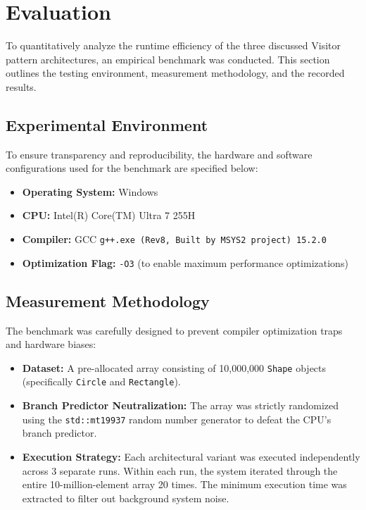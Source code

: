 \section{Evaluation}
\label{sec:evaluation}

To quantitatively analyze the runtime efficiency of the three discussed Visitor pattern architectures, an empirical benchmark was conducted. This section outlines the testing environment, measurement methodology, and the recorded results.

\subsection{Experimental Environment}
To ensure transparency and reproducibility, the hardware and software configurations used for the benchmark are specified below:
\begin{itemize}
    \item \textbf{Operating System:} Windows
    \item \textbf{CPU:} Intel(R) Core(TM) Ultra 7 255H
    \item \textbf{Compiler:} GCC \texttt{g++.exe (Rev8, Built by MSYS2 project) 15.2.0}
    \item \textbf{Optimization Flag:} \texttt{-O3} (to enable maximum performance optimizations)
\end{itemize}

\subsection{Measurement Methodology}
The benchmark was carefully designed to prevent compiler optimization traps and hardware biases:
\begin{itemize}
    \item \textbf{Dataset:} A pre-allocated array consisting of 10,000,000 \texttt{Shape} objects (specifically \texttt{Circle} and \texttt{Rectangle}).
    \item \textbf{Branch Predictor Neutralization:} The array was strictly randomized using the \texttt{std::mt19937} random number generator to defeat the CPU's branch predictor.
    \item \textbf{Execution Strategy:} Each architectural variant was executed independently across 3 separate runs. Within each run, the system iterated through the entire 10-million-element array 20 times. The minimum execution time was extracted to filter out background system noise.
\end{itemize}

